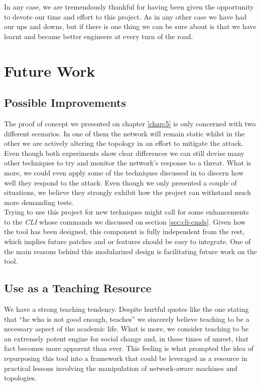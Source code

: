     In any case, we are tremendously thankful for having been given the opportunity to devote our time and effort to this project. As in any other case we have had our ups and downs, but if there is one thing we can be sure about is that we have learnt and became better engineers at every turn of the road.\\

    \section{Future Work}
        \subsection{Possible Improvements}
            The proof of concept we presented on chapter \ref{chap:5} is only concerned with two different scenarios. In one of them the network will remain static whilst in the other we are actively altering the topology in an effort to mitigate the attack. Even though both experiments show clear differences we can still devise many other techniques to try and monitor the network's response to a threat. What is more, we could even apply some of the techniques discussed in \cite{bib:react} to discern how well they respond to the attack. Even though we only presented a couple of situations, we believe they strongly exhibit how the project can withstand much more demanding tests.\\

            Trying to use this project for new techniques might call for some enhancements to the \textit{CLI} whose commands we discussed on section \ref{sec:cli-cmds}. Given how the tool has been designed, this component is fully independent from the rest, which implies future patches and or features should be easy to integrate. One of the main reasons behind this modularized design is facilitating future work on the tool.\\

        \subsection{Use as a Teaching Resource}
            We have a strong teaching tendency. Despite hurtful quotes like the one stating that ``he who is not good enough, teaches'' we sincerely believe teaching to be a necessary aspect of the academic life. What is more, we consider teaching to be an extremely potent engine for social change and, in these times of unrest, that fact becomes more apparent than ever. This feeling is what prompted the idea of repurposing this tool into a framework that could be leveraged as a resource in practical lessons involving the manipulation of network-aware machines and topologies.\\

